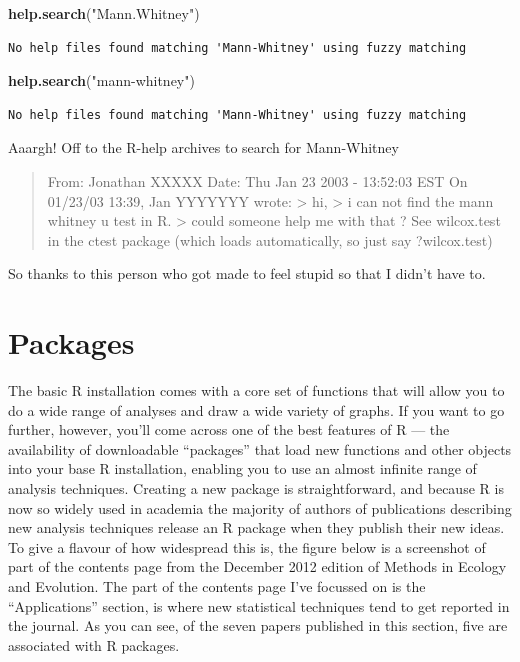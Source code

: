 \documentclass[
]{book}
\newenvironment{Shaded}{\begin{snugshade}}{\end{snugshade}}
\newcommand{\KeywordTok}[1]{\textcolor[rgb]{0.13,0.29,0.53}{\textbf{#1}}}
\newcommand{\NormalTok}[1]{#1}
\newcommand{\StringTok}[1]{\textcolor[rgb]{0.31,0.60,0.02}{#1}}
\begin{document}
\begin{Shaded}
\begin{Highlighting}[]
\KeywordTok{help.search}\NormalTok{(}\StringTok{"Mann.Whitney"}\NormalTok{)}
\end{Highlighting}
\end{Shaded}

\begin{verbatim}
No help files found matching 'Mann-Whitney' using fuzzy matching
\end{verbatim}

\begin{Shaded}
\begin{Highlighting}[]
\KeywordTok{help.search}\NormalTok{(}\StringTok{"mann-whitney"}\NormalTok{)}
\end{Highlighting}
\end{Shaded}

\begin{verbatim}
No help files found matching 'Mann-Whitney' using fuzzy matching
\end{verbatim}

Aaargh! Off to the R-help archives to search for Mann-Whitney

\begin{quote}
From: Jonathan XXXXX
Date: Thu Jan 23 2003 - 13:52:03 EST
On 01/23/03 13:39, Jan YYYYYYY wrote:
\textgreater{} hi,
\textgreater{} i can not find the mann whitney u test in R.
\textgreater{} could someone help me with that ?
See wilcox.test in the ctest package (which loads automatically,
so just say ?wilcox.test)
\end{quote}

So thanks to this person who got made to feel stupid so that I didn't have to.

\hypertarget{packages}{%
\section{Packages}\label{packages}}

The basic R installation comes with a core set of functions that will allow you to do a wide range of analyses and draw a wide variety of graphs. If you want to go further, however, you'll come across one of the best features of R --- the availability of downloadable ``packages'' that load new functions and other objects into your base R installation, enabling you to use an almost infinite range of analysis techniques. Creating a new package is straightforward, and because R is now so widely used in academia the majority of authors of publications describing new analysis techniques release an R package when they publish their new ideas. To give a flavour of how widespread this is, the figure below is a screenshot of part of the contents page from the December 2012 edition of Methods in Ecology and Evolution. The part of the contents page I've focussed on is the ``Applications'' section, is where new statistical techniques tend to get reported in the journal. As you can see, of the seven papers published in this section, five are associated with R packages.
\end{document}
